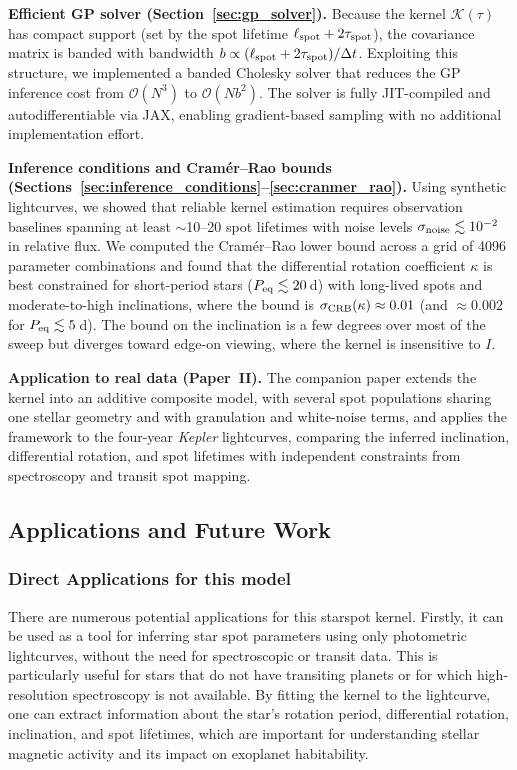 \documentclass[preprint]{aastex702}
\newcommand{\kepler}{{\it Kepler}\xspace}
\begin{document}
\textbf{Efficient GP solver (Section~\ref{sec:gp_solver}).}
Because the kernel $\mathcal{K}(\tau)$ has compact support (set by the spot lifetime $\ell_{\rm spot} + 2\tau_{\rm spot}$), the covariance matrix is banded with bandwidth $b \propto (\ell_{\rm spot} + 2\tau_{\rm spot})/\Delta t$. Exploiting this structure, we implemented a banded Cholesky solver that reduces the GP inference cost from $\mathcal{O}(N^3)$ to $\mathcal{O}(Nb^2)$. The solver is fully JIT-compiled and autodifferentiable via JAX, enabling gradient-based sampling with no additional implementation effort.

\textbf{Inference conditions and Cram\'{e}r--Rao bounds (Sections~\ref{sec:inference_conditions}--\ref{sec:cranmer_rao}).}
Using synthetic lightcurves, we showed that reliable kernel estimation requires observation baselines spanning at least $\sim$10--20 spot lifetimes with noise levels $\sigma_{\rm noise} \lesssim 10^{-2}$ in relative flux. We computed the Cram\'{e}r--Rao lower bound across a grid of 4096 parameter combinations and found that the differential rotation coefficient $\kappa$ is best constrained for short-period stars ($P_{\rm eq} \lesssim 20$\,d) with long-lived spots and moderate-to-high inclinations, where the bound is $\sigma_{\rm CRB}(\kappa) \approx 0.01$ (and $\approx 0.002$ for $P_{\rm eq} \lesssim 5$\,d). The bound on the inclination is a few degrees over most of the sweep but diverges toward edge-on viewing, where the kernel is insensitive to $I$.

\textbf{Application to real data (Paper~II).}
The companion paper extends the kernel into an additive composite model, with several spot populations sharing one stellar geometry and with granulation and white-noise terms, and applies the framework to the four-year \kepler lightcurves, comparing the inferred inclination, differential rotation, and spot lifetimes with independent constraints from spectroscopy and transit spot mapping.

\subsection{Applications and Future Work} \label{sec:applications}

\subsubsection{Direct Applications for this model}

There are numerous potential applications for this starspot kernel. Firstly, it can be used as a tool for inferring star spot parameters using only photometric lightcurves, without the need for spectroscopic or transit data. This is particularly useful for stars that do not have transiting planets or for which high-resolution spectroscopy is not available. By fitting the kernel to the lightcurve, one can extract information about the star's rotation period, differential rotation, inclination, and spot lifetimes, which are important for understanding stellar magnetic activity and its impact on exoplanet habitability. 
\end{document}
